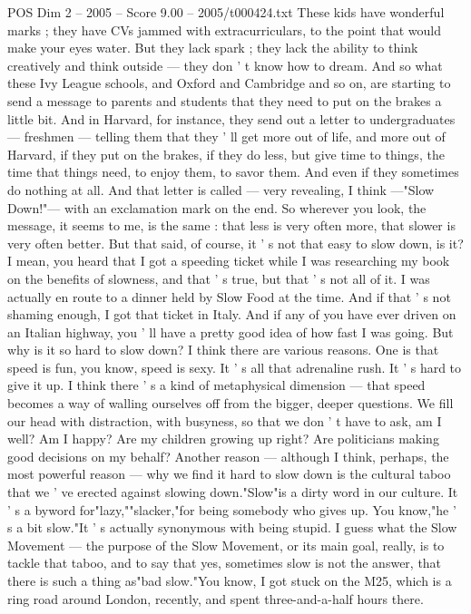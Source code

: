 \begin{textsample}{POS Dim 2 – 2005 – Score 9.00 – 2005/t000424.txt}
These kids have wonderful marks ; they have CVs jammed with extracurriculars, to the point that would make your eyes water.
But they lack spark ; they lack the ability to think creatively and think outside — they don ' t know how to dream.
And so what these Ivy League schools, and Oxford and Cambridge and so on, are starting to send a message to parents and students that they need to put on the brakes a little bit.
And in Harvard, for instance, they send out a letter to undergraduates — freshmen — telling them that they ' ll get more out of life, and more out of Harvard, if they put on the brakes, if they do less, but give time to things, the time that things need, to enjoy them, to savor them.
And even if they sometimes do nothing at all.
And that letter is called — very revealing, I think —"Slow Down!"— with an exclamation mark on the end.
So wherever you look, the message, it seems to me, is the same : that less is very often more, that slower is very often better.
But that said, of course, it ' s not that easy to slow down, is it?
I mean, you heard that I got a speeding ticket while I was researching my book on the benefits of slowness, and that ' s true, but that ' s not all of it.
I was actually en route to a dinner held by Slow Food at the time.
And if that ' s not shaming enough, I got that ticket in Italy.
And if any of you have ever driven on an Italian highway, you ' ll have a pretty good idea of how fast I was going.
But why is it so hard to slow down?
I think there are various reasons.
One is that speed is fun, you know, speed is sexy.
It ' s all that adrenaline rush.
It ' s hard to give it up.
I think there ' s a kind of metaphysical dimension — that speed becomes a way of walling ourselves off from the bigger, deeper questions.
We fill our head with distraction, with busyness, so that we don ' t have to ask, am I well?
Am I happy?
Are my children growing up right?
Are politicians making good decisions on my behalf?
Another reason — although I think, perhaps, the most powerful reason — why we find it hard to slow down is the cultural taboo that we ' ve erected against slowing down."Slow"is a dirty word in our culture.
It ' s a byword for"lazy,""slacker,"for being somebody who gives up.
You know,"he ' s a bit slow."It ' s actually synonymous with being stupid.
I guess what the Slow Movement — the purpose of the Slow Movement, or its main goal, really, is to tackle that taboo, and to say that yes, sometimes slow is not the answer, that there is such a thing as"bad slow."You know, I got stuck on the M25, which is a ring road around London, recently, and spent three-and-a-half hours there.

\end{textsample}
